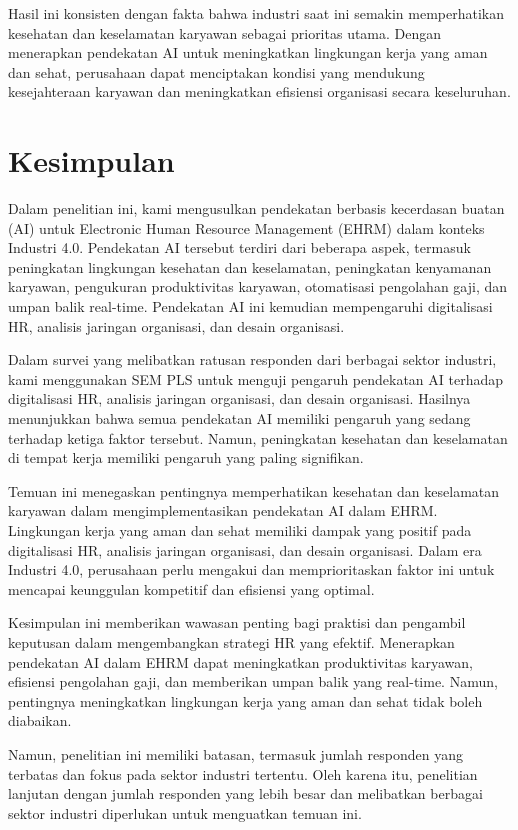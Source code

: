 \documentclass[12pt]{article}
\begin{document}
Hasil ini konsisten dengan fakta bahwa industri saat ini semakin memperhatikan kesehatan dan keselamatan karyawan sebagai prioritas utama. Dengan menerapkan pendekatan AI untuk meningkatkan lingkungan kerja yang aman dan sehat, perusahaan dapat menciptakan kondisi yang mendukung kesejahteraan karyawan dan meningkatkan efisiensi organisasi secara keseluruhan.


\section*{Kesimpulan}


Dalam penelitian ini, kami mengusulkan pendekatan berbasis kecerdasan buatan (AI) untuk Electronic Human Resource Management (EHRM) dalam konteks Industri 4.0. Pendekatan AI tersebut terdiri dari beberapa aspek, termasuk peningkatan lingkungan kesehatan dan keselamatan, peningkatan kenyamanan karyawan, pengukuran produktivitas karyawan, otomatisasi pengolahan gaji, dan umpan balik real-time. Pendekatan AI ini kemudian mempengaruhi digitalisasi HR, analisis jaringan organisasi, dan desain organisasi.

Dalam survei yang melibatkan ratusan responden dari berbagai sektor industri, kami menggunakan SEM PLS untuk menguji pengaruh pendekatan AI terhadap digitalisasi HR, analisis jaringan organisasi, dan desain organisasi. Hasilnya menunjukkan bahwa semua pendekatan AI memiliki pengaruh yang sedang terhadap ketiga faktor tersebut. Namun, peningkatan kesehatan dan keselamatan di tempat kerja memiliki pengaruh yang paling signifikan.

Temuan ini menegaskan pentingnya memperhatikan kesehatan dan keselamatan karyawan dalam mengimplementasikan pendekatan AI dalam EHRM. Lingkungan kerja yang aman dan sehat memiliki dampak yang positif pada digitalisasi HR, analisis jaringan organisasi, dan desain organisasi. Dalam era Industri 4.0, perusahaan perlu mengakui dan memprioritaskan faktor ini untuk mencapai keunggulan kompetitif dan efisiensi yang optimal.

Kesimpulan ini memberikan wawasan penting bagi praktisi dan pengambil keputusan dalam mengembangkan strategi HR yang efektif. Menerapkan pendekatan AI dalam EHRM dapat meningkatkan produktivitas karyawan, efisiensi pengolahan gaji, dan memberikan umpan balik yang real-time. Namun, pentingnya meningkatkan lingkungan kerja yang aman dan sehat tidak boleh diabaikan.

Namun, penelitian ini memiliki batasan, termasuk jumlah responden yang terbatas dan fokus pada sektor industri tertentu. Oleh karena itu, penelitian lanjutan dengan jumlah responden yang lebih besar dan melibatkan berbagai sektor industri diperlukan untuk menguatkan temuan ini.
\end{document}
